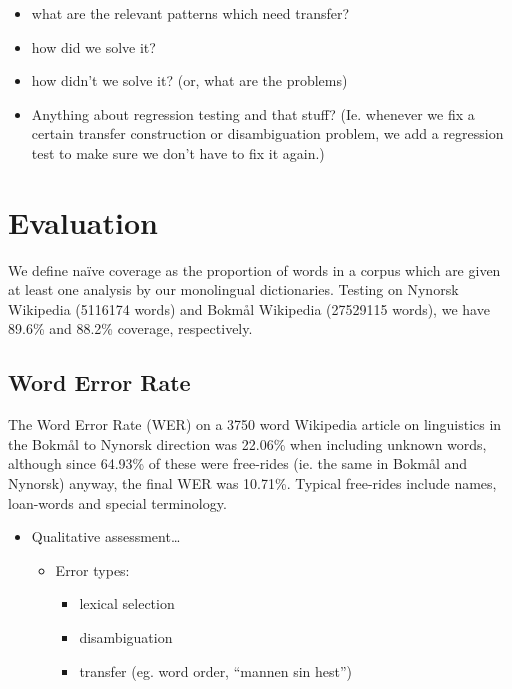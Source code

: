 \documentclass[11pt]{article}
\begin{document}
\begin{itemize}
\item what are the relevant patterns which need transfer?
\item how did we solve it?
\item how didn't we solve it? (or, what are the problems)
\item Anything about regression testing and that stuff? (Ie. whenever we
  fix a certain transfer construction or disambiguation problem, we
  add a regression test to make sure we don't have to fix it again.)
\end{itemize}

\section{Evaluation}
 \label{SEC:eval}
We define naïve coverage as the proportion of words in a corpus which
are given at least one analysis by our monolingual
dictionaries. Testing on Nynorsk Wikipedia (5116174 words) and Bokmål
Wikipedia (27529115 words), we have 89.6\% and 88.2\% coverage,
respectively.

\subsection{Word Error Rate}
The Word Error Rate (WER) on a 3750 word Wikipedia article on
linguistics in the Bokmål to Nynorsk direction was 22.06\% when
including unknown words, although since 64.93\% of these were
free-rides (ie. the same in Bokmål and Nynorsk) anyway, the final WER
was 10.71\%. Typical free-rides include names, loan-words and special
terminology.

\begin{itemize}
\item Qualitative assessment\ldots{}

\begin{itemize}
\item Error types:

\begin{itemize}
\item lexical selection
\item disambiguation
\item transfer (eg. word order, ``mannen sin hest'')
\end{itemize}

\end{itemize}


\end{itemize}
\end{document}
